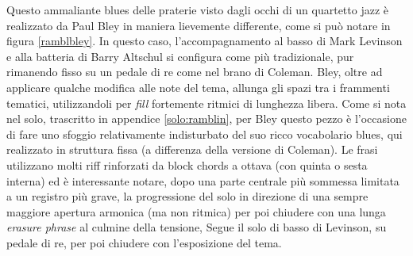 Questo ammaliante blues delle praterie visto dagli occhi di un quartetto jazz è realizzato da Paul Bley in maniera lievemente differente, come si può notare in figura \ref{ramblbley}.
In questo caso, l'accompagnamento al basso di Mark Levinson e alla batteria di Barry Altschul si configura come più tradizionale, pur rimanendo fisso su un pedale di re come nel brano di Coleman. Bley, oltre ad applicare qualche modifica alle note del tema, allunga gli spazi tra i frammenti tematici, utilizzandoli per \textit{fill} fortemente ritmici di lunghezza libera. Come si nota nel solo, trascritto in appendice \ref{solo:ramblin}, per Bley questo pezzo è l'occasione di fare uno sfoggio relativamente indisturbato del suo ricco vocabolario blues, qui realizzato in struttura fissa (a differenza della versione di Coleman). Le frasi utilizzano molti riff rinforzati da block chords a ottava (con quinta o sesta interna) ed è interessante notare, dopo una parte centrale più sommessa limitata a un registro più grave, la progressione del solo in direzione di una sempre maggiore apertura armonica (ma non ritmica) per poi chiudere con una lunga \textit{erasure phrase} al culmine della tensione, Segue il solo di basso di Levinson, su pedale di re, per poi chiudere con l'esposizione del tema.
